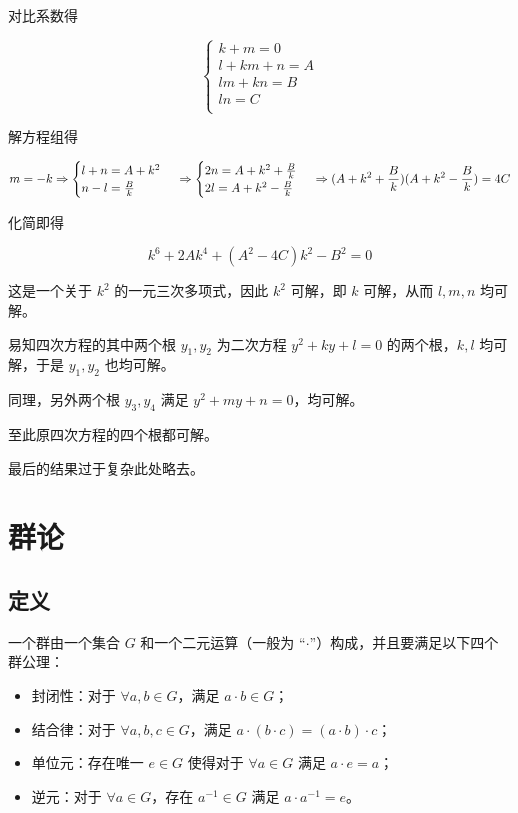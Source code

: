 \documentclass[hyperref,UTF8,12pt,a4paper]{ctexart}
\begin{document}
对比系数得

$$
\begin{cases}
k+m=0 \\
l+km+n=A \\
lm+kn=B \\
ln=C \\
\end{cases}
$$

解方程组得

$$
m=-k \\
\Rightarrow
\begin{cases}
l+n=A+k^2 \\
n-l=\frac Bk \\
\end{cases} \\
\Rightarrow
\begin{cases}
2n=A+k^2+\frac Bk \\
2l=A+k^2-\frac Bk \\
\end{cases} \\
\Rightarrow
(A+k^2+\frac Bk)(A+k^2-\frac Bk)=4C
$$

化简即得

$$
k^6+2Ak^4+(A^2-4C)k^2-B^2=0
$$

这是一个关于 $k^2$ 的一元三次多项式，因此 $k^2$ 可解，即 $k$ 可解，从而 $l,m,n$ 均可解。

易知四次方程的其中两个根 $y_1,y_2$ 为二次方程 $y^2+ky+l=0$ 的两个根，$k, l$ 均可解，于是 $y_1,y_2$ 也均可解。

同理，另外两个根 $y_3,y_4$ 满足 $y^2+my+n=0$，均可解。

至此原四次方程的四个根都可解。

最后的结果过于复杂此处略去。

\section{群论}

\subsection{定义}

一个群由一个集合 $G$ 和一个二元运算（一般为 “$\cdot$”）构成，并且要满足以下四个群公理：

\begin{itemize}
\item 封闭性：对于 $\forall a,b \in G$，满足 $a \cdot b \in G$；
\item 结合律：对于 $\forall a,b,c \in G$，满足 $a \cdot (b \cdot c)= (a \cdot b) \cdot c$；
\item 单位元：存在唯一 $e \in G$ 使得对于 $\forall a \in G$ 满足 $a \cdot e = a$；
\item 逆元：对于 $\forall a \in G$，存在 $a^{-1} \in G$ 满足 $a \cdot a^{-1}=e$。
\end{itemize}
\end{document}
